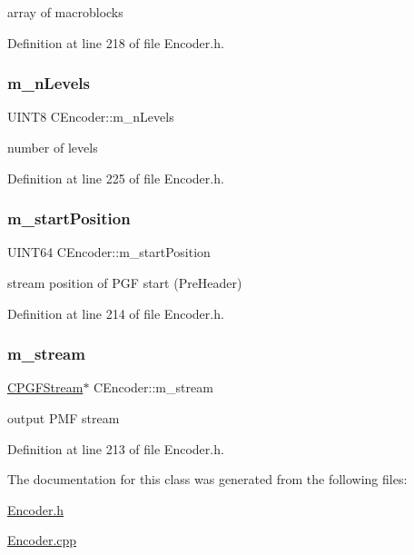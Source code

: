 array of macroblocks 



Definition at line 218 of file Encoder.\+h.

\mbox{\label{classCEncoder_a821892e5cf7a82b43898bc4e15717bfb}} 
\subsubsection{\texorpdfstring{m\_nLevels}{m\_nLevels}}
{\footnotesize\ttfamily U\+I\+N\+T8 C\+Encoder\+::m\+\_\+n\+Levels\hspace{0.3cm}{\ttfamily [private]}}



number of levels 



Definition at line 225 of file Encoder.\+h.

\mbox{\label{classCEncoder_a32012be0814bbc611963517e482d1111}} 
\subsubsection{\texorpdfstring{m\_startPosition}{m\_startPosition}}
{\footnotesize\ttfamily U\+I\+N\+T64 C\+Encoder\+::m\+\_\+start\+Position\hspace{0.3cm}{\ttfamily [private]}}



stream position of P\+GF start (Pre\+Header) 



Definition at line 214 of file Encoder.\+h.

\mbox{\label{classCEncoder_ad01ad5ea3003064b00516dad191d3499}} 
\subsubsection{\texorpdfstring{m\_stream}{m\_stream}}
{\footnotesize\ttfamily \mbox{\hyperlink{classCPGFStream}{C\+P\+G\+F\+Stream}}$\ast$ C\+Encoder\+::m\+\_\+stream\hspace{0.3cm}{\ttfamily [private]}}



output P\+MF stream 



Definition at line 213 of file Encoder.\+h.



The documentation for this class was generated from the following files\+:\begin{DoxyCompactItemize}
\item 
\mbox{\hyperlink{Encoder_8h}{Encoder.\+h}}\item 
\mbox{\hyperlink{Encoder_8cpp}{Encoder.\+cpp}}\end{DoxyCompactItemize}
